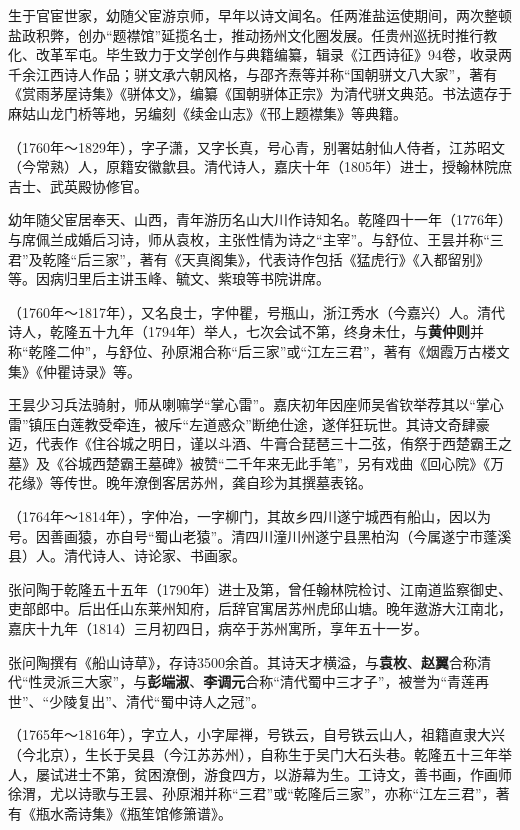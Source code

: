 \begin{description}
        生于官宦世家，幼随父宦游京师，早年以诗文闻名。任两淮盐运使期间，两次整顿盐政积弊，创办“题襟馆”延揽名士，推动扬州文化圈发展。任贵州巡抚时推行教化、改革军屯。毕生致力于文学创作与典籍编纂，辑录《江西诗征》94卷，收录两千余江西诗人作品；骈文承六朝风格，与邵齐焘等并称“国朝骈文八大家”，著有《赏雨茅屋诗集》《骈体文》，编纂《国朝骈体正宗》为清代骈文典范。书法遗存于麻姑山龙门桥等地，另编刻《续金山志》《邗上题襟集》等典籍。
  \item[孙原湘] （1760年～1829年），字子潇，又字长真，号心青，别署姑射仙人侍者，江苏昭文（今常熟）人，原籍安徽歙县。清代诗人，嘉庆十年（1805年）进士，授翰林院庶吉士、武英殿协修官。\par
        幼年随父宦居奉天、山西，青年游历名山大川作诗知名。乾隆四十一年（1776年）与席佩兰成婚后习诗，师从袁枚，主张性情为诗之“主宰”。与舒位、王昙并称“三君”及乾隆“后三家”，著有《天真阁集》，代表诗作包括《猛虎行》《入都留别》等。因病归里后主讲玉峰、毓文、紫琅等书院讲席。
  \item[王昙] （1760年～1817年），又名良士，字仲瞿，号瓶山，浙江秀水（今嘉兴）人。清代诗人，乾隆五十九年（1794年）举人，七次会试不第，终身未仕，与\textbf{黄仲则}并称“乾隆二仲”，与舒位、孙原湘合称“后三家”或“江左三君”，著有《烟霞万古楼文集》《仲瞿诗录》等。\par
        王昙少习兵法骑射，师从喇嘛学“掌心雷”。嘉庆初年因座师吴省钦举荐其以“掌心雷”镇压白莲教受牵连，被斥“左道惑众”断绝仕途，遂佯狂玩世。其诗文奇肆豪迈，代表作《住谷城之明日，谨以斗酒、牛膏合琵琶三十二弦，侑祭于西楚霸王之墓》及《谷城西楚霸王墓碑》被赞“二千年来无此手笔”，另有戏曲《回心院》《万花缘》等传世。晚年潦倒客居苏州，龚自珍为其撰墓表铭。
  \item[张问陶] （1764年～1814年），字仲冶，一字柳门，其故乡四川遂宁城西有船山，因以为号。因善画猿，亦自号“蜀山老猿”。清四川潼川州遂宁县黑柏沟（今属遂宁市蓬溪县）人。清代诗人、诗论家、书画家。\par
        张问陶于乾隆五十五年（1790年）进士及第，曾任翰林院检讨、江南道监察御史、吏部郎中。后出任山东莱州知府，后辞官寓居苏州虎邱山塘。晚年遨游大江南北，嘉庆十九年（1814）三月初四日，病卒于苏州寓所，享年五十一岁。\par
        张问陶撰有《船山诗草》，存诗3500余首。其诗天才横溢，与\textbf{袁枚}、\textbf{赵翼}合称清代“性灵派三大家”，与\textbf{彭端淑}、\textbf{李调元}合称“清代蜀中三才子”，被誉为“青莲再世”、“少陵复出”、清代“蜀中诗人之冠”。
  \item[舒位] （1765年～1816年），字立人，小字犀禅，号铁云，自号铁云山人，祖籍直隶大兴（今北京），生长于吴县（今江苏苏州），自称生于吴门大石头巷。乾隆五十三年举人，屡试进士不第，贫困潦倒，游食四方，以游幕为生。工诗文，善书画，作画师徐渭，尤以诗歌与王昙、孙原湘并称“三君”或“乾隆后三家”，亦称“江左三君”，著有《瓶水斋诗集》《瓶笙馆修箫谱》。\par

\end{description}
